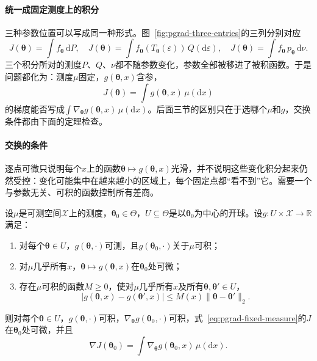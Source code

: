 \paragraph{统一成固定测度上的积分}

三种参数位置可以写成同一种形式。图~\ref{fig:pgrad-three-entries}的三列分别对应
\[
  J(\bm{\theta})=\int f_{\bm{\theta}}\,\mathrm{d}P,\quad
  J(\bm{\theta})=\int f_{\bm{\theta}}(T_{\bm{\theta}}(\varepsilon))\,Q(\mathrm{d}\varepsilon),\quad
  J(\bm{\theta})=\int f_{\bm{\theta}}\,p_{\bm{\theta}}\,\mathrm{d}\nu .
\]
三个积分所对的测度$P$、$Q$、$\nu$都不随参数变化，参数全部被移进了被积函数。于是问题都化为：测度$\mu$固定，$g(\bm{\theta},x)$含参，
\begin{equation}
  J(\bm{\theta})=\int g(\bm{\theta},x)\,\mu(\mathrm{d}x)
  \label{eq:pgrad-fixed-measure}
\end{equation}
的梯度能否写成$\int\nabla_{\bm{\theta}}g(\bm{\theta},x)\,\mu(\mathrm{d}x)$。后面三节的区别只在于选哪个$\mu$和$g$，交换条件都由下面的定理检查。

\paragraph{交换的条件}

逐点可微只说明每个$x$上的函数$\bm{\theta}\mapsto g(\bm{\theta},x)$光滑，并不说明这些变化积分起来仍然受控：变化可能集中在越来越小的区域上，每个固定点都“看不到”它。需要一个与参数无关、可积的函数控制所有差商。

\begin{theorem}[积分号下求导]
\label{thm:pgrad-exchange}
设$\mu$是可测空间$\mathcal{X}$上的测度，$\bm{\theta}_{0}\in\Theta$，$U\subseteq\Theta$是以$\bm{\theta}_{0}$为中心的开球。设$g:U\times\mathcal{X}\to\mathbb{R}$满足：
\begin{enumerate}
  \item 对每个$\bm{\theta}\in U$，$g(\bm{\theta},\cdot)$可测，且$g(\bm{\theta}_{0},\cdot)$关于$\mu$可积；
  \item 对$\mu$几乎所有$x$，$\bm{\theta}\mapsto g(\bm{\theta},x)$在$\bm{\theta}_{0}$处可微；
  \item 存在$\mu$可积的函数$M\geq0$，使对$\mu$几乎所有$x$及所有$\bm{\theta},\bm{\theta}'\in U$，
  \begin{equation}
    \lvert g(\bm{\theta},x)-g(\bm{\theta}',x)\rvert\leq M(x)\lVert\bm{\theta}-\bm{\theta}'\rVert_{2}.
    \label{eq:pgrad-lipschitz}
  \end{equation}
\end{enumerate}
则对每个$\bm{\theta}\in U$，$g(\bm{\theta},\cdot)$可积，$\nabla_{\bm{\theta}}g(\bm{\theta}_{0},\cdot)$可积，式~\eqref{eq:pgrad-fixed-measure}的$J$在$\bm{\theta}_{0}$处可微，并且
\begin{equation}
  \nabla J(\bm{\theta}_{0})=\int\nabla_{\bm{\theta}}g(\bm{\theta}_{0},x)\,\mu(\mathrm{d}x).
  \label{eq:pgrad-exchange}
\end{equation}
\end{theorem}

